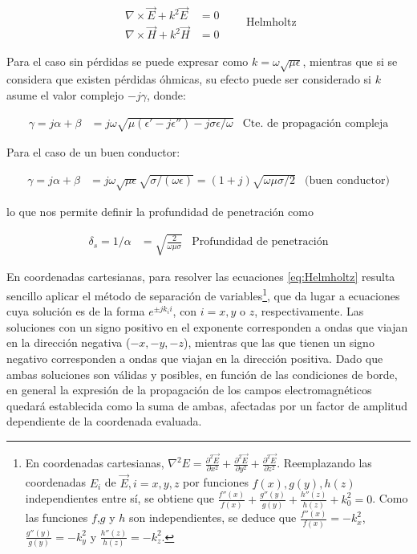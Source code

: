 \begin{equation}
	\label{eq:Helmholtz}
	\begin{aligned}
		\nabla \times \vec{E} + k^2 \vec{E} &= 0  \\
		\nabla \times \vec{H} + k^2 \vec{H}& = 0 
	\end{aligned}
	\qquad \text{Helmholtz}
\end{equation}

Para el caso sin pérdidas se puede expresar como $k = \omega \sqrt{\mu \epsilon}$, mientras que si se considera que existen pérdidas óhmicas,  su efecto puede ser considerado si  $k$ asume el valor complejo $-j\gamma$, donde:

\begin{align}
\label{eq:constante-propagacion-compleja}
\gamma = j\alpha + \beta &= j\omega \sqrt{\mu (\epsilon'-j\epsilon'') - j \sigma \epsilon/\omega} & \text{Cte. de propagación compleja}
\end{align}

Para el caso de un buen conductor:

\begin{align}
\gamma = j\alpha + \beta &= j \omega \sqrt{\mu \epsilon} \sqrt{\sigma/(\omega \epsilon)} = (1+j) \sqrt{\omega \mu \sigma/2} & \text{(buen conductor)}
\end{align}

lo que nos permite definir la profundidad de penetración como 

\begin{align}
\delta_s = 1/\alpha &= \sqrt{\frac{2}{\omega \mu \sigma}} & \text{Profundidad de penetración}
\end{align}

En coordenadas cartesianas, para resolver las ecuaciones \ref{eq:Helmholtz} resulta sencillo aplicar el método de separación de variables\footnote{En coordenadas cartesianas, $\nabla^2 E = \frac{\partial^2 \vec{E}}{\partial x^2} + \frac{\partial^2 \vec{E}}{\partial y^2} + \frac{\partial^2 \vec{E}}{\partial z^2}$. Reemplazando las coordenadas $E_i$ de $\vec{E}, i=x,y,z$ por funciones $f(x),g(y),h(z)$ independientes entre sí, se obtiene que $\frac{f''(x)}{f(x)} + \frac{g''(y)}{g(y)} + \frac{h''(z)}{h(z)} + k_0^2 = 0$. Como las funciones $f$,$g$ y $h$ son independientes, se deduce que $\frac{f''(x)}{f(x)} = -k_x^2$, $\frac{g''(y)}{g(y)} = -k_y^2$ y $\frac{h''(z)}{h(z)} = -k_z^2$.}, que da lugar a ecuaciones cuya solución es de la forma $e^{\pm j k_i i}$, con $i = x, y$ o $z$, respectivamente. Las soluciones con un signo positivo en el exponente corresponden a ondas que viajan en la dirección negativa ($-x, -y, -z$), mientras que las que tienen un signo negativo corresponden a ondas que viajan en la dirección positiva. Dado que ambas soluciones son válidas y posibles, en función de las condiciones de borde, en general la expresión de la propagación de los campos electromagnéticos quedará establecida como la suma de ambas, afectadas por un factor de amplitud dependiente de la coordenada evaluada.

